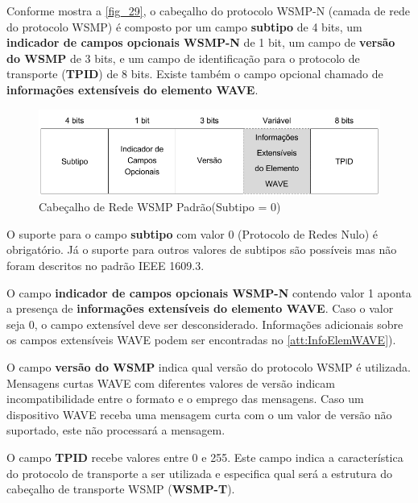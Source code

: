 \documentclass[
12pt,				%
openright,			%
oneside,			%
a4paper,			%
brazil,				%
]{abntex2}
\begin{document}
	\par Conforme mostra a \autoref{fig_29}, o cabeçalho do protocolo WSMP-N (camada de rede do protocolo WSMP) é composto por um campo \textbf{subtipo} de 4 bits, um \textbf{indicador de campos opcionais WSMP-N} de 1 bit, um campo de \textbf{versão do WSMP} de 3 bits, e um campo de identificação para o protocolo de transporte (\textbf{TPID}) de 8 bits. Existe também o campo opcional chamado de \textbf{informações extensíveis do elemento WAVE}.
	
	\begin{figure} [H]
		\centering
		\includegraphics[scale=.5]{figuras/cap3/30CabecalhoDeRedeWSMPPadrao(Subtipo0)}
		\caption{\label{fig_30}Cabeçalho de Rede WSMP Padrão(Subtipo = 0)}
	\end{figure}
	
	\par O suporte para o campo \textbf{subtipo} com valor 0 (Protocolo de Redes Nulo) é obrigatório. Já o suporte para outros valores de subtipos são possíveis mas não foram descritos no padrão IEEE 1609.3.
	
	\par O campo \textbf{indicador de campos opcionais WSMP-N} contendo valor 1 aponta a presença de \textbf{informações extensíveis do elemento WAVE}. Caso o valor seja 0, o campo extensível deve ser desconsiderado. Informações adicionais sobre os campos extensíveis WAVE podem ser encontradas no \autoref{att:InfoElemWAVE}).
	
	\par O campo \textbf{versão do WSMP} indica qual versão do protocolo WSMP é utilizada. Mensagens curtas WAVE com diferentes valores de versão indicam incompatibilidade entre o formato e o emprego das mensagens. Caso um dispositivo WAVE receba uma mensagem curta com o um valor de  versão não suportado, este não processará a mensagem. 
	
	\par O campo \textbf{TPID} recebe valores entre 0 e 255. Este campo indica a característica do protocolo de transporte a ser utilizada e especifica qual será a estrutura do cabeçalho de transporte WSMP (\textbf{WSMP-T}).
	
\end{document}
